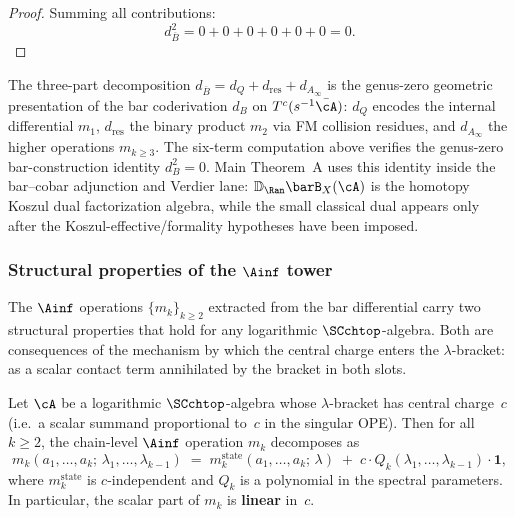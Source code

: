\begin{proof}
Summing all contributions:
\begin{equation}
d_{\overline{B}}^2 = 0 + 0 + 0 + 0 + 0 + 0 = 0.
\end{equation}
\end{proof}

\begin{remark}
\label{rem:bar-differential-vol1-identification}
The three-part decomposition $d_{\overline{B}} = d_Q + d_{\mathrm{res}}
+ d_{A_\infty}$ is the genus-zero geometric presentation of the bar
coderivation $d_B$ on $T^c(s^{-1}\bar{\cA})$: $d_Q$ encodes the
internal differential $m_1$, $d_{\mathrm{res}}$ the binary product
$m_2$ via FM collision residues, and $d_{A_\infty}$ the higher
operations $m_{k \geq 3}$. The six-term computation above verifies
the genus-zero bar-construction identity $d_B^2=0$. Main Theorem~A
uses this identity inside the bar--cobar adjunction and Verdier lane:
$\mathbb{D}_{\Ran}\barB_X(\cA)$ is the homotopy Koszul dual
factorization algebra, while the small classical dual appears only
after the Koszul-effective/formality hypotheses have been imposed.
\end{remark}

\subsubsection{Structural properties of the $\Ainf$ tower}

The $\Ainf$ operations $\{m_k\}_{k \ge 2}$ extracted from the
bar differential carry two structural properties that hold for
any logarithmic $\SCchtop$-algebra. Both are consequences of
the mechanism by which the central charge enters the $\lambda$-bracket:
as a scalar contact term annihilated by the bracket in both slots.

\begin{proposition}
\label{prop:c-linearity-general}
Let\/ $\cA$ be a logarithmic $\SCchtop$-algebra whose
$\lambda$-bracket has central charge~$c$
\textup{(}i.e.\ a scalar summand proportional to~$c$
in the singular OPE\textup{)}. Then for all $k \ge 2$, the
chain-level $\Ainf$ operation $m_k$ decomposes as
\[
m_k(a_1, \ldots, a_k;\, \lambda_1, \ldots, \lambda_{k-1})
\;=\;
m_k^{\mathrm{state}}(a_1, \ldots, a_k;\, \lambda)
\;+\;
c \cdot Q_k(\lambda_1, \ldots, \lambda_{k-1})\cdot\mathbf{1},
\]
where $m_k^{\mathrm{state}}$ is $c$-independent and
$Q_k$ is a polynomial in the spectral parameters. In particular,
the scalar part of $m_k$ is \textbf{linear} in~$c$.
\end{proposition}

